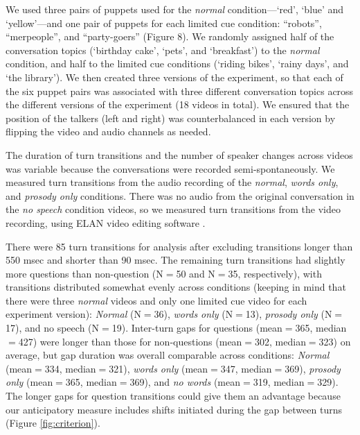 \documentclass[authoryear, 12pt]{elsarticle}
\begin{document}
We used three pairs of puppets used for the \textit{normal} condition---`red', `blue' and `yellow'---and one pair of puppets for each limited cue condition: ``robots'', ``merpeople'', and ``party-goers'' (Figure 8). We randomly assigned half of the conversation topics (`birthday cake', `pets', and `breakfast') to the \textit{normal} condition, and half to the limited cue conditions (`riding bikes', `rainy days', and `the library'). We then created three versions of the experiment, so that each of the six puppet pairs was associated with three different conversation topics across the different versions of the experiment (18 videos in total). We ensured that the position of the talkers (left and right) was counterbalanced in each version by flipping the video and audio channels as needed.


The duration of turn transitions and the number of speaker changes across videos was variable because the conversations were recorded semi-spontaneously. We measured turn transitions from the audio recording of the \textit{normal}, \textit{words only}, and \textit{prosody only} conditions. There was no audio from the original conversation in the \textit{no speech} condition videos, so we measured turn transitions from the video recording, using ELAN video editing software \citep{ELAN}. 

There were 85 turn transitions for analysis after excluding transitions longer than 550 msec and shorter than 90 msec. The remaining turn transitions had slightly more questions than non-question (N$=$50 and N$=$35, respectively), with transitions distributed somewhat evenly across conditions (keeping in mind that there were three \textit{normal} videos and only one limited cue video for each experiment version): \textit{Normal} (N$=$36), \textit{words only} (N$=$13), \textit{prosody only} (N$=$17), and {no speech} (N$=$19). Inter-turn gaps for questions (mean$=$365, median$=$427) were longer than those for non-questions (mean$=$302, median$=$323) on average, but gap duration was overall comparable across conditions: \textit{Normal} (mean$=$334, median$=$321), \textit{words only} (mean$=$347, median$=$369), \textit{prosody only} (mean$=$365, median$=$369), and \textit{no words} (mean$=$319, median$=$329). The longer gaps for question transitions could give them an advantage because our anticipatory measure includes shifts initiated during the gap between turns (Figure \ref{fig:criterion}).
\end{document}
